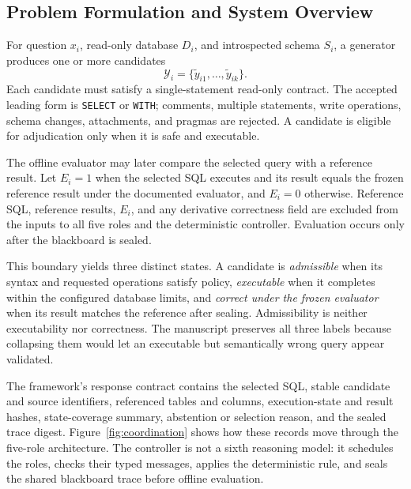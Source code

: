 \documentclass[applsci,article,submit,moreauthors]{Definitions/mdpi}
\begin{document}
\subsection{Problem Formulation and System Overview}

For question $x_i$, read-only database $D_i$, and introspected schema $S_i$, a generator produces one or more candidates
\begin{equation}
\mathcal{Y}_i=\{\widetilde{y}_{i1},\ldots,\widetilde{y}_{ik}\}.
\end{equation}
Each candidate must satisfy a single-statement read-only contract. The accepted leading form is \texttt{SELECT} or \texttt{WITH}; comments, multiple statements, write operations, schema changes, attachments, and pragmas are rejected. A candidate is eligible for adjudication only when it is safe and executable.

The offline evaluator may later compare the selected query with a reference result. Let $E_i=1$ when the selected SQL executes and its result equals the frozen reference result under the documented evaluator, and $E_i=0$ otherwise. Reference SQL, reference results, $E_i$, and any derivative correctness field are excluded from the inputs to all five roles and the deterministic controller. Evaluation occurs only after the blackboard is sealed.

This boundary yields three distinct states. A candidate is \emph{admissible} when its syntax and requested operations satisfy policy, \emph{executable} when it completes within the configured database limits, and \emph{correct under the frozen evaluator} when its result matches the reference after sealing. Admissibility is neither executability nor correctness. The manuscript preserves all three labels because collapsing them would let an executable but semantically wrong query appear validated.

The framework's response contract contains the selected SQL, stable candidate and source identifiers, referenced tables and columns, execution-state and result hashes, state-coverage summary, abstention or selection reason, and the sealed trace digest. Figure~\ref{fig:coordination} shows how these records move through the five-role architecture. The controller is not a sixth reasoning model: it schedules the roles, checks their typed messages, applies the deterministic rule, and seals the shared blackboard trace before offline evaluation.
\end{document}
